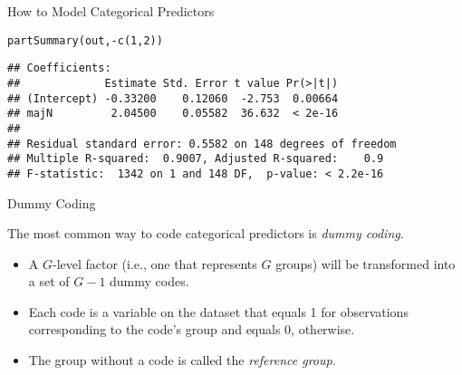 \documentclass{beamer}\usepackage[]{graphicx}\usepackage[]{color}
\makeatletter
\newcommand{\hlnum}[1]{\textcolor[rgb]{0.69,0.494,0}{#1}}%
\newcommand{\hlopt}[1]{\textcolor[rgb]{0,0,0}{#1}}%
\newcommand{\hlstd}[1]{\textcolor[rgb]{0,0,0}{#1}}%
\newcommand{\hlkwd}[1]{\textcolor[rgb]{0.004,0.004,0.506}{#1}}%
\newenvironment{kframe}{%
 \def\at@end@of@kframe{}%
 \ifinner\ifhmode%
  \def\at@end@of@kframe{\end{minipage}}%
  \begin{minipage}{\columnwidth}%
 \fi\fi%
 \def\FrameCommand##1{\hskip\@totalleftmargin \hskip-\fboxsep
 \colorbox{shadecolor}{##1}\hskip-\fboxsep
     \hskip-\linewidth \hskip-\@totalleftmargin \hskip\columnwidth}%
 \MakeFramed {\advance\hsize-\width
   \@totalleftmargin\z@ \linewidth\hsize
   \@setminipage}}%
 {\par\unskip\endMakeFramed%
 \at@end@of@kframe}
\newenvironment{knitrout}{}{} %
\makeatother
\begin{document}
\begin{frame}[fragile]{How to Model Categorical Predictors}
  
\begin{knitrout}\footnotesize
{}\color{fgcolor}\begin{kframe}
\begin{alltt}
\hlkwd{partSummary}\hlstd{(out,} \hlopt{-}\hlkwd{c}\hlstd{(}\hlnum{1}\hlstd{,} \hlnum{2}\hlstd{))}
\end{alltt}
\begin{verbatim}
## Coefficients:
##             Estimate Std. Error t value Pr(>|t|)
## (Intercept) -0.33200    0.12060  -2.753  0.00664
## majN         2.04500    0.05582  36.632  < 2e-16
## 
## Residual standard error: 0.5582 on 148 degrees of freedom
## Multiple R-squared:  0.9007,	Adjusted R-squared:    0.9 
## F-statistic:  1342 on 1 and 148 DF,  p-value: < 2.2e-16
\end{verbatim}
\end{kframe}
\end{knitrout}

\end{frame}

\watermarkon %

\begin{frame}{Dummy Coding}
  
  The most common way to code categorical predictors is \emph{dummy coding}.
  \vb
  \begin{itemize}
  \item A $G$-level factor (i.e., one that represents $G$ groups) will be 
    transformed into a set of $G - 1$ dummy codes.
    \vb
  \item Each code is a variable on the dataset that equals 1 for observations
    corresponding to the code's group and equals 0, otherwise.
    \vb
  \item The group without a code is called the \emph{reference group}.
  \end{itemize}
  
\end{frame}

\end{document}
